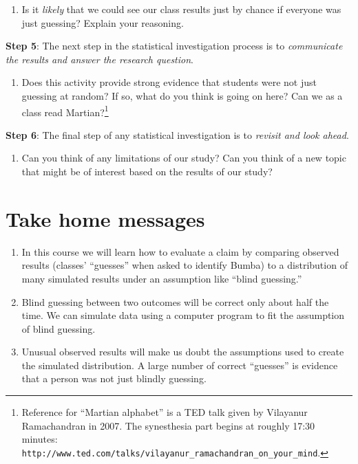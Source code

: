 \documentclass[
]{report}
\providecommand{\tightlist}{%
  \setlength{\itemsep}{0pt}\setlength{\parskip}{0pt}}
\begin{document}
\vspace{.5in}

\begin{enumerate}
\def\labelenumi{\arabic{enumi}.}
\setcounter{enumi}{16}
\tightlist
\item
  Is it \emph{likely} that we could see our class results just by chance if everyone was just guessing? Explain your reasoning.
\end{enumerate}

\vspace{.5in}

\textbf{Step 5}: The next step in the statistical investigation process is to \emph{communicate the results and answer the research question}.

\begin{enumerate}
\def\labelenumi{\arabic{enumi}.}
\setcounter{enumi}{17}
\tightlist
\item
  Does this activity provide strong evidence that students were not just guessing at random? If so, what do you think is going on here? Can we as a class read Martian?\footnote{Reference for ``Martian alphabet'' is a TED talk given by Vilayanur Ramachandran in 2007. The synesthesia part begins at roughly 17:30 minutes: \texttt{http://www.ted.com/talks/vilayanur\_ramachandran\_on\_your\_mind}.}
\end{enumerate}

\vspace{1in}

\textbf{Step 6}: The final step of any statistical investigation is to \emph{revisit and look ahead}.

\begin{enumerate}
\def\labelenumi{\arabic{enumi}.}
\setcounter{enumi}{18}
\tightlist
\item
  Can you think of any limitations of our study? Can you think of a new topic that might be of interest based on the results of our study?
\end{enumerate}

\vspace{1in}

\hypertarget{take-home-messages}{%
\section{Take home messages}\label{take-home-messages}}

\begin{enumerate}
\def\labelenumi{\arabic{enumi}.}
\item
  In this course we will learn how to evaluate a claim by comparing observed results (classes' ``guesses'' when asked to identify Bumba) to a distribution of many simulated results under an assumption like ``blind guessing.''
\item
  Blind guessing between two outcomes will be correct only about half the time. We can simulate data using a computer program to fit the assumption of blind guessing.
\item
  Unusual observed results will make us doubt the assumptions used to create the simulated distribution. A large number of correct ``guesses'' is evidence that a person was not just blindly guessing.
\end{enumerate}
\end{document}
